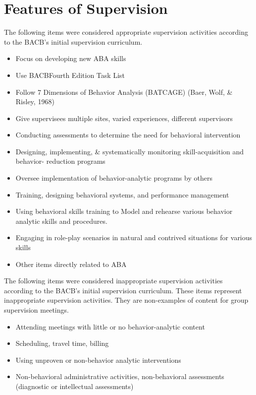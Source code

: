 \section{Features of Supervision}
The following items were considered appropriate supervision activities according to the BACB's initial supervision curriculum.
\begin{itemize}
\item Focus on developing new ABA skills
\item Use BACB\textregistered Fourth Edition Task List
\item Follow 7 Dimensions of Behavior Analysis (BATCAGE) (Baer, Wolf, \& Risley, 1968)
\item Give supervisees multiple sites, varied experiences, different supervisors
\item Conducting assessments to determine the need for behavioral intervention
\item Designing, implementing, \& systematically monitoring skill-acquisition and behavior- reduction programs
\item Oversee implementation of behavior-analytic programs by others
\item Training, designing behavioral systems, and performance management
\item Using behavioral skills training to Model and rehearse various behavior analytic skills and procedures.
\item Engaging in role-play scenarios in natural and contrived situations for various skills
\item Other items directly related to ABA
\end{itemize}

The following items were considered inappropriate supervision activities according to the BACB's initial supervision curriculum. These items represent inappropriate supervision activities. They are non-examples of content for group supervision meetings.

\begin{itemize}
\item Attending meetings with little or no behavior-analytic content
\item Scheduling, travel time, billing
\item Using unproven or non-behavior analytic interventions 
\item Non-behavioral administrative activities, non-behavioral assessments (diagnostic or intellectual assessments)
\end{itemize}

